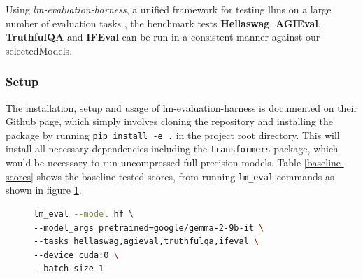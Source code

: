 \documentclass{ifacconf}
\begin{document}
    Using \textit{lm-evaluation-harness}, a unified framework for testing \glspl{llm} on a large number of evaluation tasks \cite{eval-harness}, the benchmark tests \textbf{Hellaswag}, \textbf{AGIEval}, \textbf{TruthfulQA} and \textbf{IFEval} can be run in a consistent manner against our \gls{selectedModels}.

    \subsubsection{Setup}
    The installation, setup and usage of lm-evaluation-harness is documented on their Github page, which simply involves cloning the repository and installing the package by running \verb|pip install -e .| in the project root directory. This will install all necessary dependencies including the \verb|transformers| package, which would be necessary to run uncompressed full-precision models. Table \ref{baseline-scores} shows the baseline tested scores, from running \verb|lm_eval| commands as shown in figure \ref{lm-eval-command}.

    \begin{figure}[H]
    \centering
    \begin{lstlisting}[language=bash,numbers=none]
lm_eval --model hf \
--model_args pretrained=google/gemma-2-9b-it \
--tasks hellaswag,agieval,truthfulqa,ifeval \
--device cuda:0 \
--batch_size 1
    \end{lstlisting}
    \label{lm-eval-command}
    \end{figure}
    
\end{document}

